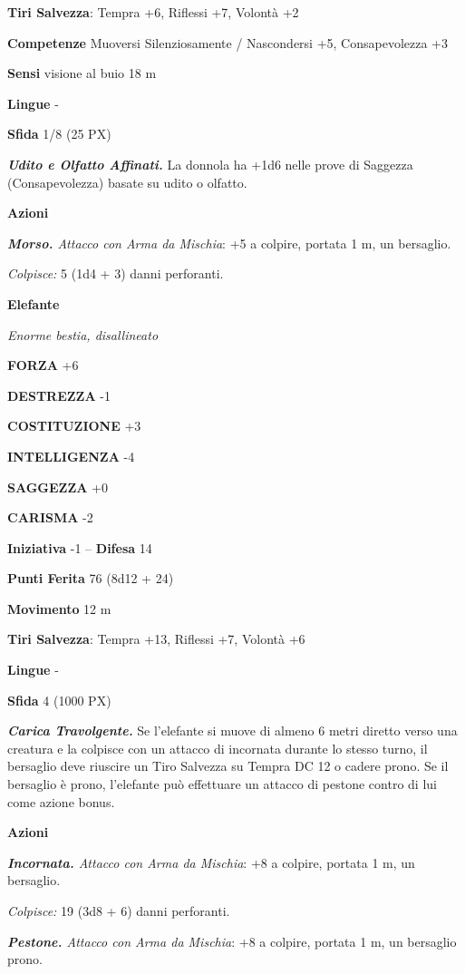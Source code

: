 \begin{multicols}{2}
\textbf{Tiri Salvezza}: Tempra +6, Riflessi +7, Volontà +2

\textbf{Competenze} Muoversi Silenziosamente / Nascondersi +5, Consapevolezza +3

\textbf{Sensi} visione al buio 18 m

\textbf{Lingue} -

\textbf{Sfida} 1/8 (25 PX)

\textit{\textbf{Udito e Olfatto Affinati.}} La donnola ha +1d6 nelle prove di Saggezza (Consapevolezza) basate su udito o olfatto.

\textbf{Azioni}

\textit{\textbf{Morso.} Attacco con Arma da Mischia}: +5 a colpire, portata 1 m, un bersaglio.

\textit{Colpisce:} 5 (1d4 + 3) danni perforanti.

\medskip\textbf{Elefante}

\textit{Enorme bestia, disallineato}

\textbf{FORZA} +6

\textbf{DESTREZZA} -1

\textbf{COSTITUZIONE} +3

\textbf{INTELLIGENZA} -4

\textbf{SAGGEZZA} +0

\textbf{CARISMA} -2

\textbf{Iniziativa} -1 -- \textbf{Difesa} 14

\textbf{Punti Ferita} 76 (8d12 + 24)

\textbf{Movimento} 12 m

\textbf{Tiri Salvezza}: Tempra +13, Riflessi +7, Volontà +6

\textbf{Lingue} -

\textbf{Sfida} 4 (1000 PX)

\textit{\textbf{Carica Travolgente.}} Se l'elefante si muove di almeno 6 metri diretto verso una creatura e la colpisce con un attacco di incornata durante lo stesso turno, il bersaglio deve riuscire un Tiro Salvezza su Tempra DC 12 o cadere prono. Se il bersaglio è prono, l'elefante può effettuare un attacco di pestone contro di lui come azione bonus.

\textbf{Azioni}

\textit{\textbf{Incornata.} Attacco con Arma da Mischia}: +8 a colpire, portata 1 m, un bersaglio.

\textit{Colpisce:} 19 (3d8 + 6) danni perforanti.

\textit{\textbf{Pestone.} Attacco con Arma da Mischia}: +8 a colpire, portata 1 m, un bersaglio prono.


\end{multicols}
